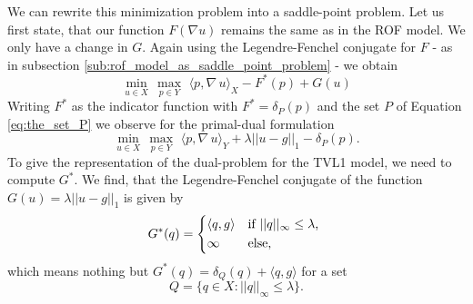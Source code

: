         We can rewrite this minimization problem into a saddle-point problem. Let us first state, that our function $F(\nabla u)$ remains the same as in the ROF model. We only have a change in $G$.
        Again using the Legendre-Fenchel conjugate for $F$ - as in subsection \ref{sub:rof_model_as_saddle_point_problem} - we obtain
            $$
                \min_{u \in X}\, \max_{p \in Y}\,\, \langle p, \nabla \, u \rangle_{X} - F^{\ast}(p) + G(u)%
            $$
        Writing $F^{\ast}$ as the indicator function with $F^{\ast} = \delta_{P}(p)$ and the set $P$ of Equation \ref{eq:the_set_P} we observe for the primal-dual formulation
            \begin{equation}
                \min_{u \in X}\, \max_{p \in Y}\,\, \langle p, \nabla\, u \rangle_{Y} + \lambda ||u - g||_{1} - \delta_{P}(p).
            \label{eq:primal_dual_tvl1_problem}
            \end{equation}
        To give the representation of the dual-problem for the TVL1 model, we need to compute $G^{\ast}$. We find, that the Legendre-Fenchel conjugate of the function $G(u) = \lambda||u-g||_{1}$ is given by
            \begin{equation}
                G^{\ast}(q) =
                    \begin{dcases*}
                        \langle q, g \rangle & \textnormal{if $||q||_{\infty} \le \lambda$,} \\
                        \infty & \textnormal{else},
                    \end{dcases*}
                \label{eq:tvl1_g_star}
            \end{equation}
        which means nothing but $G^{\ast}(q) = \delta_{Q}(q) + \langle q, g \rangle$ for a set
            \begin{equation}
                Q = \big\{ q \in X : ||q||_{\infty} \le \lambda \big\}.
            \label{eq:the_set_Q}
            \end{equation}

